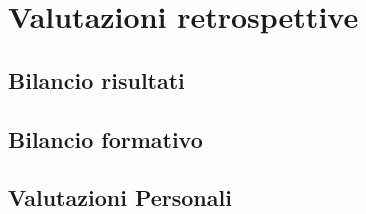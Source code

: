 
\chapter{Valutazioni retrospettive}
\label{cap:valutazione-retrospettive}

\section{Bilancio risultati}
\section{Bilancio formativo}
\section{Valutazioni Personali}

